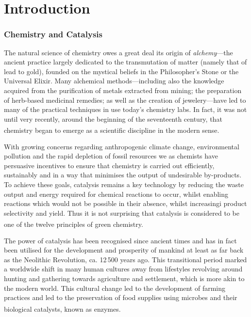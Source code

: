 
\chapter{Introduction} %

\label{ch:introduction} %


\subsection{Chemistry and Catalysis}

\label{ss:chemistryandcatalysis}

\noindent The natural science of chemistry owes a great deal its origin of \textit{alchemy}---the ancient practice largely dedicated to the transmutation of matter (namely that of lead to gold), founded on the mystical beliefs in the Philosopher's Stone or the Universal Elixir. Many alchemical methods---including also the knowledge acquired from the purification of metals extracted from mining; the preparation of herb-based medicinal remedies; as well as the creation of jewelery---have led to many of the practical techniques in use today's chemistry labs. In fact, it was not until very recently, around the beginning of the seventeenth century, that chemistry began to emerge as a scientific discipline in the modern sense.\textsuperscript{\cite{greenberg:2007}}

With growing concerns regarding anthropogenic climate change, environmental pollution and the rapid depletion of fossil resources we as chemists have persuasive incentives to ensure that chemistry is carried out efficiently, sustainably and in a way that minimises the output of undesirable by-products. To achieve these goals, catalysis remains a key technology by reducing the waste output and energy required for chemical reactions to occur, whilst enabling reactions which would not be possible in their absence, whilst increasingi product selectivity and yield. Thus it is not surprising that catalysis is considered to be one of the twelve principles of green chemistry.\textsuperscript{\cite{anastas:1998}}

The power of catalysis has been recognised since ancient times and has in fact been utilised for the development and prosperity of mankind at least as far back as the Neolithic Revolution, ca. 12\,500 years ago. This transitional period marked a worldwide shift in many human cultures away from lifestyles revolving around hunting and gathering towards agriculture and settlement, which is more akin to the modern world. This cultural change led to the development of farming practices and led to the preservation of food supplies using microbes and their biological catalysts, known as enzymes.\textsuperscript{\cite{vogel:2019}}

